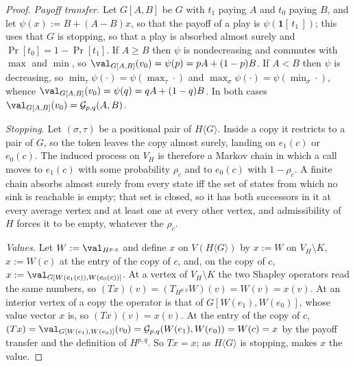 \begin{proof}
\emph{Payoff transfer.} Let $G[A,B]$ be $G$ with $t_1$ paying $A$ and $t_0$
paying $B$, and let $\psi(x):=B+(A-B)x$, so that the payoff of a play is
$\psi(\mathbf 1[\,t_1\,])$; this uses that $G$ is stopping, so that a play is
absorbed almost surely and $\Pr[t_0]=1-\Pr[t_1]$. If $A\ge B$ then $\psi$ is
nondecreasing and commutes with $\max$ and $\min$, so
$\val_{G[A,B]}(v_0)=\psi(p)=pA+(1-p)B$. If $A<B$ then $\psi$ is decreasing, so
$\min_\tau\psi(\cdot)=\psi(\max_\tau\cdot)$ and
$\max_\sigma\psi(\cdot)=\psi(\min_\sigma\cdot)$, whence
$\val_{G[A,B]}(v_0)=\psi(q)=qA+(1-q)B$. In both cases
$\val_{G[A,B]}(v_0)=\mathcal{G}_{p,q}(A,B)$.

\emph{Stopping.} Let $(\sigma,\tau)$ be a positional pair of $H\langle
G\rangle$. Inside a copy it restricts to a pair of $G$, so the token leaves the
copy almost surely, landing on $e_1(c)$ or $e_0(c)$. The induced process on
$V_H$ is therefore a Markov chain in which a call moves to $e_1(c)$ with some
probability $\rho_c$ and to $e_0(c)$ with $1-\rho_c$. A finite chain absorbs
almost surely from every state iff the set of states from which no sink is
reachable is empty; that set is closed, so it has both successors in it at
every average vertex and at least one at every other vertex, and admissibility
of $H$ forces it to be empty, whatever the $\rho_c$.

\emph{Values.} Let $W:=\val_{H^{p,q}}$ and define $x$ on $V(H\langle G\rangle)$
by $x:=W$ on $V_H\setminus K$, $x:=W(c)$ at the entry of the copy of $c$, and,
on the copy of $c$, $x:=\val_{G[W(e_1(c)),W(e_0(c))]}$. At a vertex of
$V_H\setminus K$ the two Shapley operators read the same numbers, so
$(Tx)(v)=(T_{H^{p,q}}W)(v)=W(v)=x(v)$. At an interior vertex of a copy the
operator is that of $G[W(e_1),W(e_0)]$, whose value vector $x$ is, so
$(Tx)(v)=x(v)$. At the entry of the copy of $c$,
$(Tx)=\val_{G[W(e_1),W(e_0)]}(v_0)=\mathcal{G}_{p,q}(W(e_1),W(e_0))=W(c)=x$ by
the payoff transfer and the definition of $H^{p,q}$. So $Tx=x$; as
$H\langle G\rangle$ is stopping,  makes $x$ the value.
\end{proof}

